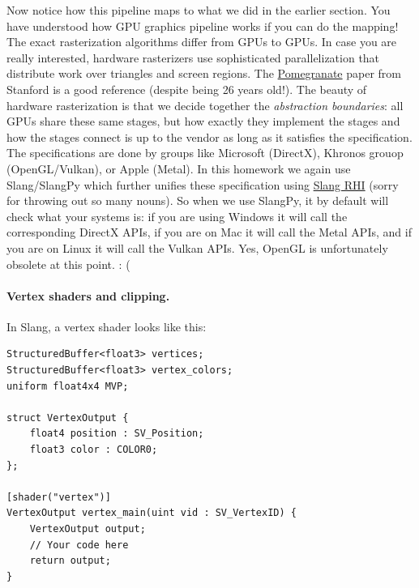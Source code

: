 Now notice how this pipeline maps to what we did in the earlier section. You have understood how GPU graphics pipeline works if you can do the mapping! The exact rasterization algorithms differ from GPUs to GPUs. In case you are really interested, hardware rasterizers use sophisticated parallelization that distribute work over triangles and screen regions. The \href{https://graphics.stanford.edu/papers/pomegranate/}{Pomegranate} paper from Stanford is a good reference (despite being 26 years old!). The beauty of hardware rasterization is that we decide together the \emph{abstraction boundaries}: all GPUs share these same stages, but how exactly they implement the stages and how the stages connect is up to the vendor as long as it satisfies the specification. The specifications are done by groups like Microsoft (DirectX), Khronos grouop (OpenGL/Vulkan), or Apple (Metal). In this homework we again use Slang/SlangPy which further unifies these specification using \href{https://github.com/shader-slang/slang-rhi}{Slang RHI} (sorry for throwing out so many nouns). So when we use SlangPy, it by default will check what your systems is: if you are using Windows it will call the corresponding DirectX APIs, if you are on Mac it will call the Metal APIs, and if you are on Linux it will call the Vulkan APIs. Yes, OpenGL is unfortunately obsolete at this point. : (

\paragraph{Vertex shaders and clipping.}
In Slang, a vertex shader looks like this:
\begin{lstlisting}
StructuredBuffer<float3> vertices;
StructuredBuffer<float3> vertex_colors;
uniform float4x4 MVP;

struct VertexOutput {
    float4 position : SV_Position;
    float3 color : COLOR0;
};

[shader("vertex")]
VertexOutput vertex_main(uint vid : SV_VertexID) {
    VertexOutput output;
    // Your code here
    return output;
}
\end{lstlisting}


